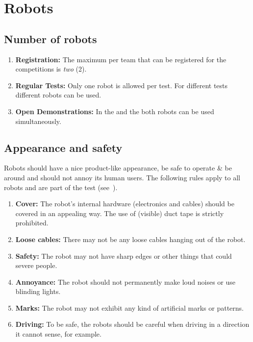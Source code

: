\section{Robots}
\label{rule:robots}

\subsection{Number of robots}
\label{rule:robots_number}

\begin{enumerate}
	\item \textbf{Registration:} The maximum  per team that can be registered for the competitions is \emph{two} (2).
	\item \textbf{Regular Tests:} Only one robot is allowed per test. For different tests different robots can be used.
	\item \textbf{Open Demonstrations:} In the  and the  both robots can be used simultaneously.
\end{enumerate}

\subsection{Appearance and safety}
\label{rule:robot_appearance}

Robots should have a nice product-like appearance, be safe to operate \& be around and should not annoy its human users. The following rules apply to all robots and are part of the  test (see~).
\begin{enumerate}
	\item \textbf{Cover:} The robot's internal hardware (electronics and cables) should be covered in an appealing way. The use of (visible) duct tape is strictly prohibited.
	\item \textbf{Loose cables:} There may not be any loose cables hanging out of the robot.
	\item \textbf{Safety:} The robot may not have sharp edges or other things that could severe people.
	\item \textbf{Annoyance:} The robot should not permanently make loud noises or use blinding lights.
	\item \textbf{Marks:} The robot may not exhibit any kind of artificial marks or patterns.
	\item \textbf{Driving:} To be safe, the robots should be careful when driving in a direction it cannot sense, for example.
\end{enumerate}







